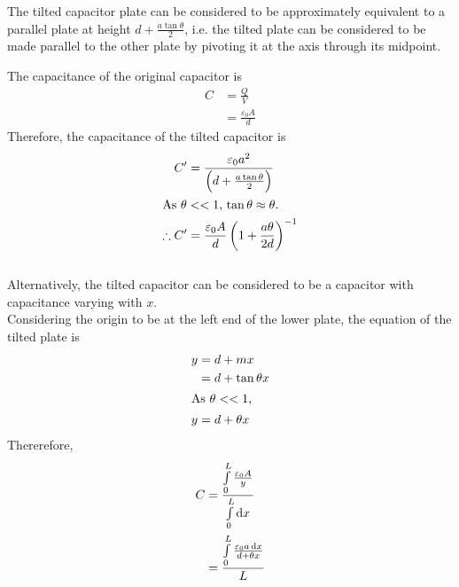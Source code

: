 \documentclass[fleqn, a4paper, 12pt, twoside]{article}
\theoremstyle{definition}
\theoremstyle{theorem}
\begin{document}
\begin{solution}
	The tilted capacitor plate can be considered to be approximately equivalent to a parallel plate at height $d + \frac{a \tan \theta}{2}$, i.e. the tilted plate can be considered to be made parallel to the other plate by pivoting it at the axis through its midpoint.
	\begin{figure}[H]
	\end{figure}
	The capacitance of the original capacitor is
	\begin{align*}
		C & = \frac{Q}{V} \\
                  & = \frac{\varepsilon_0 A}{d}
	\end{align*}
	Therefore, the capacitance of the tilted capacitor is
	\begin{align*}
		C'            & = \frac{\varepsilon_0 a^2}{\left( d + \frac{a \tan \theta}{2} \right)} \\
		\intertext{As $\theta << 1$, $\tan \theta \approx \theta$.}
		\therefore C' & = \frac{\varepsilon_0 A}{d} \left( 1 + \frac{a \theta}{2 d} \right)^{-1}
	\end{align*}
	~\\
	Alternatively, the tilted capacitor can be considered to be a capacitor with capacitance varying with $x$.\\
	Considering the origin to be at the left end of the lower plate, the equation of the tilted plate is
	\begin{align*}
		y & = d + m x           \\
                  & = d + \tan \theta x \\
		\intertext{As $\theta << 1$,}
		y & = d + \theta x
	\end{align*}
	Thererefore,
	\begin{align*}
		C & = \frac{\int\limits_{0}^{L} \frac{\varepsilon_0 A}{y}}{\int\limits_{0}^{L} \dif x}                                                     \\
                  & = \frac{\int\limits_{0}^{L} \frac{\varepsilon_0 a \dif x}{d + \theta x}}{L}                                                            \\

\end{align*}
\end{solution}
\end{document}
